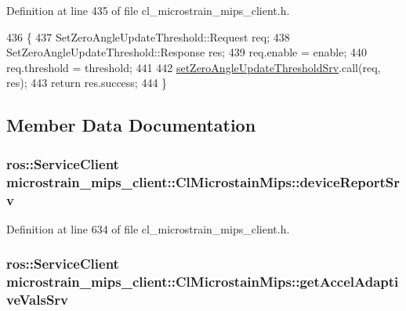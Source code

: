 Definition at line 435 of file cl\+\_\+microstrain\+\_\+mips\+\_\+client.\+h.


\begin{DoxyCode}
436     \{
437         SetZeroAngleUpdateThreshold::Request req;
438         SetZeroAngleUpdateThreshold::Response res;
439         req.enable = enable;
440         req.threshold = threshold;
441 
442         \hyperlink{classmicrostrain__mips__client_1_1ClMicrostainMips_aa512e932514eba1022ac4453942dfb68}{setZeroAngleUpdateThresholdSrv}.call(req, res);
443         \textcolor{keywordflow}{return} res.success;
444     \}
\end{DoxyCode}


\subsection{Member Data Documentation}
\subsubsection[{\texorpdfstring{device\+Report\+Srv}{deviceReportSrv}}]{\setlength{\rightskip}{0pt plus 5cm}ros\+::\+Service\+Client microstrain\+\_\+mips\+\_\+client\+::\+Cl\+Microstain\+Mips\+::device\+Report\+Srv\hspace{0.3cm}{\ttfamily [protected]}}\hypertarget{classmicrostrain__mips__client_1_1ClMicrostainMips_a7d7f4bfa828c87c27e1b7cab613e42e1}{}\label{classmicrostrain__mips__client_1_1ClMicrostainMips_a7d7f4bfa828c87c27e1b7cab613e42e1}


Definition at line 634 of file cl\+\_\+microstrain\+\_\+mips\+\_\+client.\+h.

\subsubsection[{\texorpdfstring{get\+Accel\+Adaptive\+Vals\+Srv}{getAccelAdaptiveValsSrv}}]{\setlength{\rightskip}{0pt plus 5cm}ros\+::\+Service\+Client microstrain\+\_\+mips\+\_\+client\+::\+Cl\+Microstain\+Mips\+::get\+Accel\+Adaptive\+Vals\+Srv\hspace{0.3cm}{\ttfamily [protected]}}\hypertarget{classmicrostrain__mips__client_1_1ClMicrostainMips_ad3a6f23505de5793b9cf107306e8a649}{}\label{classmicrostrain__mips__client_1_1ClMicrostainMips_ad3a6f23505de5793b9cf107306e8a649}


